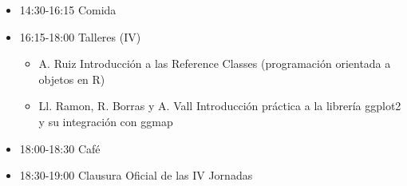 \begin{itemize}
\begin{itemize}
  \item 14:30-16:15 Comida
  \item 16:15-18:00 Talleres (IV)
    \begin{itemize}
    \item A. Ruiz Introducción a las Reference Classes
      (programación orientada a objetos en R)
    \item Ll. Ramon, R. Borras y A. Vall Introducción práctica a
      la librería ggplot2 y su integración con ggmap
    \end{itemize}
  \item 18:00-18:30 Café

  \item 18:30-19:00 Clausura Oficial de las IV Jornadas

  \end{itemize}
\end{itemize}


